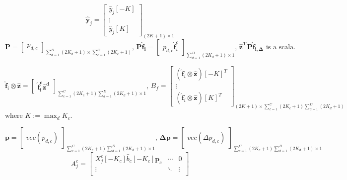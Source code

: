 \documentclass[12pt]{article}
\numberwithin{equation}{section}
\begin{document}
{\begin{equation}
\end{equation}
\begin{equation}
	 \hat{\bm{y}}_j= 
	\begin{bmatrix}
		\hat{y}_j[-K] \\  \vdots \\ \hat{y}_j[K] 
	\end{bmatrix}_{(2K+1) \times 1}
\end{equation}
\begin{equation}
	\bm{P}=
	\begin{bmatrix}
		p_{d, c}
	\end{bmatrix}_{\sum^{D}_{d=1}(2K_d+1) \times \sum^{C}_{c=1}(2K_c+1)}
	\text{, }
	\bm{P}\bm{\hat{f}_i}=
	\begin{bmatrix}
		p_{d, c}\bm{\hat{f}}^c_i 
	\end{bmatrix}_{\sum^{D}_{d=1}(2K_d+1) \times 1}
	\text{, }
	\bm{\hat{z}^TP\hat{f}_{i,\Delta}} \text{ is a scala.}
\end{equation}\par
\begin{equation}
	\bm{\hat{f}}_i \otimes \bm{\hat{z}}=
	\begin{bmatrix}
		\bm{\hat{f}^c_i\hat{z}^d}
	\end{bmatrix}_{\sum^{C}_{c=1}(2K_c+1)\sum^{D}_{d=1}(2K_d+1) \times 1}
	\text{, }
	 B_f= 
	\begin{bmatrix}
		(\bm{\hat{f}}_i \otimes \bm{\hat{z}})[-K]^T \\  \vdots \\ (\bm{\hat{f}}_i \otimes \bm{\hat{z}})[K]^T
	\end{bmatrix}_{(2K+1) \times \sum^{C}_{c=1}(2K_c+1)\sum^{D}_{d=1}(2K_d+1)}
\end{equation}
where $K:=\max_dK_c$.  \par
\begin{equation}
 	\bm{p}= 
	\begin{bmatrix}
		vec(p_{d,c})
	\end{bmatrix}_{\sum^{C}_{c=1}(2K_c+1)\sum^{D}_{d=1}(2K_d+1) \times 1}
	 \text{,   }
	 \bm{\Delta p}= 
	\begin{bmatrix}
		vec(\Delta p_{d,c})
	\end{bmatrix}_{\sum^{C}_{c=1}(2K_c+1)\sum^{D}_{d=1}(2K_d+1) \times 1}
\end{equation}
\begin{equation}
	A^c_j = 
	\begin{bmatrix}
		X^c_j[-K_c]\hat{b}_c[-K_c] \bm{p}_c & \cdots & 0 \\
		\vdots & \ddots & \vdots \\

\end{bmatrix}
\end{equation}}
\end{document}
